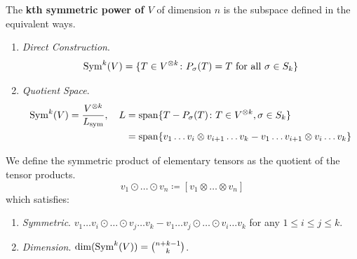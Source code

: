 	\begin{definition}
	  \label{def:symmetric-power}
		The \textbf{kth symmetric power of $V$} of dimension $n$ is the subspace defined in the equivalent ways. 
		\begin{enumerate}
		  \item \textit{Direct Construction}. 
				\begin{equation}
					\operatorname{Sym}^k (V) = \{T \in V^{\otimes k} \colon P_\sigma(T) = T \text{ for all } \sigma \in S_k \}
				\end{equation}

			\item \textit{Quotient Space}. 
				\begin{align}
					\operatorname{Sym}^k (V) = \frac{V^{\otimes k}}{L_{\mathrm{sym}}}, \quad L 
						& = \mathrm{span} \{ T - P_\sigma(T) \colon T \in V^{\otimes k}, \sigma \in S_k \} \\ 
						& = \mathrm{span} \{ v_1 \ldots v_i \otimes v_{i+1} \ldots v_k - v_1 \ldots v_{i+1} \otimes v_i \ldots v_k\}
				\end{align}
		\end{enumerate} 
		We define the symmetric product of elementary tensors as the quotient of the tensor products.
		\begin{equation}
			v_1 \odot \ldots \odot v_n \coloneqq [v_1 \otimes \ldots \otimes v_n] 
		\end{equation}
		which satisfies: 
		\begin{enumerate}
			\item \textit{Symmetric}. $v_1 \ldots v_i \odot \ldots \odot  v_{j} \ldots v_k - v_1 \ldots v_j \odot \ldots \odot v_i \ldots v_k$ for any $1 \leq i \leq j \leq k$. 
			\item \textit{Dimension}. $\dim(\operatorname{Sym}^k (V)) = \binom{n+k-1}{k}$. 
		\end{enumerate}
	\end{definition}
